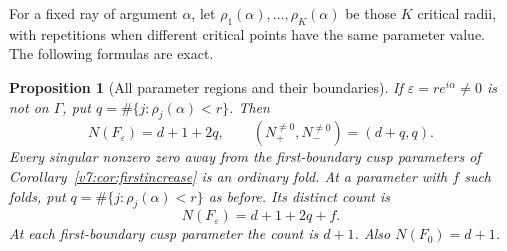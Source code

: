 \documentclass[UTF8,11pt]{ctexart}
\newtheorem{prop}[thm]{Proposition}
\theoremstyle{definition}
\numberwithin{equation}{section}
\begin{document}
For a fixed ray of argument $\alpha$, let
$\rho_1(\alpha),\ldots,\rho_K(\alpha)$ be those $K$ critical
radii, with repetitions when different critical points have the
same parameter value. The following formulas are exact.
\begin{prop}[All parameter regions and their boundaries]
\label{v9:prop:allparameters}
If $\varepsilon=re^{i\alpha}\ne0$ is not on $\Gamma$, put
$q=\#\{j:\rho_j(\alpha)<r\}$. Then
\begin{equation}\label{v9:eq:allparameters}
 N(F_\varepsilon)=d+1+2q,\qquad
 (N^{\ne0}_+,N^{\ne0}_-)=(d+q,q).
\end{equation}
Every singular nonzero zero away from the first-boundary cusp
parameters of Corollary~\ref{v7:cor:firstincrease} is an ordinary fold.
At a parameter with $f$ such folds, put
$q=\#\{j:\rho_j(\alpha)<r\}$ as before. Its distinct count is
\begin{equation}\label{v9:eq:foldcount}
 N(F_\varepsilon)=d+1+2q+f.
\end{equation}
At each first-boundary cusp parameter the count is $d+1$.
Also $N(F_0)=d+1$.
\end{prop}
\end{document}
